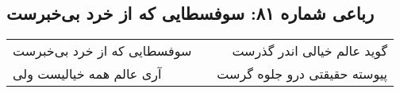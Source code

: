 \begin{center}
\section*{رباعی شماره ۸۱: سوفسطایی که از خرد بی‌خبرست}
\label{sec:sh081}
\begin{longtable}{l p{0.5cm} r}
سوفسطایی که از خرد بی‌خبرست
&&
گوید عالم خیالی اندر گذرست
\\
آری عالم همه خیالیست ولی
&&
پیوسته حقیقتی درو جلوه گرست
\\
\end{longtable}
\end{center}
